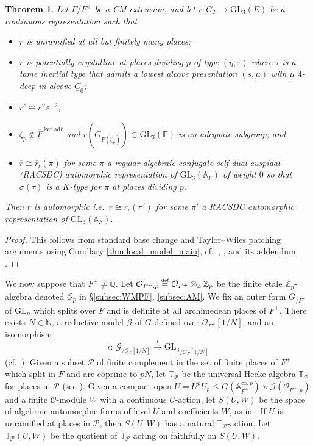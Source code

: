 \documentclass[oneside,a4paper,english, 11pt]{amsart}
\theoremstyle{plain}
\newtheorem{thm}{Theorem}[subsection]
\theoremstyle{plain}
\theoremstyle{plain}
\theoremstyle{plain}
\theoremstyle{plain}
\theoremstyle{plain}
\theoremstyle{definition}
\theoremstyle{definition}
\theoremstyle{definition}
\theoremstyle{remark}
\numberwithin{equation}{section}
\newcommand{\Z}{\mathbb{Z}}
\newcommand{\Q}{\mathbb{Q}}
\newcommand{\F}{\mathbb{F}}
\newcommand{\N}{\mathbb{N}}
\newcommand{\A}{\mathbb{A}}
\newcommand{\cG}{\mathcal{G}}
\newcommand{\cO}{\mathcal{O}}
\newcommand{\cP}{\mathcal{P}}
\newcommand{\Zp}{\mathbb{Z}_p}
\newcommand{\GL}{\mathrm{GL}}
\newcommand{\ad}{\mathrm{ad}}
\newcommand{\un}[1]{\underline{#1}}
\newcommand{\rbar}{\overline{r}}
\newcommand{\defeq}{\stackrel{\textrm{\tiny{def}}}{=}}
\newcommand{\ovl}[1]{\overline{#1}}
\newcommand{\ra}{\rightarrow}
\begin{document}
\begin{thm} \label{thm:modularity_lifting}
Let $F/F^+$ be a CM extension, and let $r: G_F \ra \GL_3(E)$ be a continuous representation such that 
\begin{itemize}
\item $r$ is unramified at all but finitely many places;
\item $r$ is potentially crystalline at places dividing $p$ of type $(\eta,\tau)$ where $\tau$ is a tame inertial type that admits a lowest alcove presentation $(s,\mu)$ with $\mu$ $4$-deep in alcove $\un{C}_0$;
\item $r^c \cong r^\vee \varepsilon^{-2}$;
%
\item $\zeta_p\notin \ovl{F}^{\ker\ad\rbar}$ and $\rbar(G_{F(\zeta_p)}) \subset \GL_3(\F)$ is an adequate subgroup; and
\item $\rbar \cong \rbar_\iota(\pi)$ for some $\pi$ a regular algebraic conjugate self-dual cuspidal (RACSDC) automorphic representation of $\GL_3(\A_F)$ of weight $0$ so that $\sigma(\tau)$ is a $K$-type for $\pi$ at places dividing $p$.
\end{itemize}
Then $r$ is automorphic i.e.~$r \cong r_\iota(\pi')$ for some $\pi'$ a RACSDC automorphic representation of $\GL_3(\A_F)$.%
\end{thm}
\begin{proof}
This follows from standard base change and Taylor--Wiles patching arguments using Corollary \ref{thm:local_model_main}, cf.~\cite[Theorem 9.2.1]{MLM}, \cite[Theorem 7.4]{LLLM}, and its addendum \cite[\S 6]{LLLM2}.
\end{proof}

We now suppose that $F^+\neq \Q$. 
Let $\cO_{F^+,p}\defeq \cO_{F^{+}}\otimes_{\Z}\Zp$ be the finite \'etale $\Zp$-algebra denoted $\cO_p$ in \S \ref{subsec:WMPF}, \ref{subsec:AM}.
We fix an outer form $G_{/F^+}$ of $\GL_n$ which splits over $F$ and is definite at all archimedean places of $F^+$.
There exists $N\in \N$, a reductive model $\cG$ of $G$ defined over $\cO_{F^+}[1/N]$, and an isomorphism
\begin{equation}
\label{iso integral}
\iota:\,\cG_{/\cO_{F}[1/N]} \stackrel{\iota}{\rightarrow}{\GL_3}_{/\cO_{F}[1/N]}
\end{equation}
(cf.~\cite[\S 7.1]{EGH}). 
Given a subset $\cP$ of finite complement in the set of finite places of $F^+$ which split in $F$ and are coprime to $pN$, let $\mathbb{T}_{\cP}$ be the universal Hecke algebra $\mathbb{T}_{\cP}$ for places in $\cP$ (see \cite[\S 9.1]{MLM}). 
Given a compact open $U=U^pU_p\leq G(\mathbb{A}_{F^+}^{\infty,p})\times \cG(\cO_{F^+,p})$ and a finite $\cO$-module $W$ with a continuous $U$-action, let $S(U,W)$ be the space of algebraic automorphic forms of level $U$ and coefficients $W$, as in \cite[(9.2)]{MLM}. 
If $U$ is unramified at places in $\cP$, then $S(U,W)$ has a natural $\mathbb{T}_{\cP}$-action. 
Let $\mathbb{T}_{\cP}(U,W)$ be the quotient of $\mathbb{T}_{\cP}$ acting on faithfully on $S(U,W)$.
\end{document}
